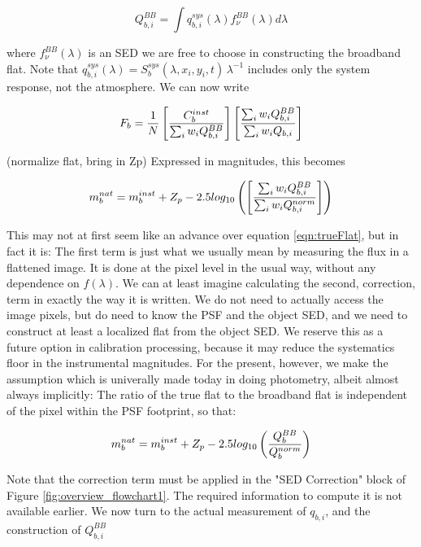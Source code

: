 \documentclass[12pt,preprint]{aastex}
\begin{document}
\begin{equation}
Q_{b,i}^{BB} = \int {q_{b,i}^{sys}(\lambda) f_\nu^{BB}(\lambda) d\lambda}
\end{equation}

where $f_\nu^{BB}(\lambda)$ is an SED we are free to choose in constructing the broadband flat. Note that 
$q_{b,i}^{sys}(\lambda)=S_b^{sys}(\lambda,x_i,y_i,t) \, \lambda^{-1}$ 
includes only the system response, not the atmosphere.  We can now write

\begin{equation}
F_b = {1 \over N} \left[ {C_b^{inst} \over {\sum_i{w_i Q_{b,i}^{BB}}}}\right]  \left[ {\sum_i {w_i Q_{b,i}^{BB} }} \over {\sum_i {w_i Q_{b,i} }}\right]
\end{equation}

(normalize flat, bring in Zp) Expressed in magnitudes, this becomes

\begin{equation}
m_b^{nat} = m_b^{inst} + Z_p - 2.5 log_{10} \left( \left[ {\sum_i {w_i Q_{b,i}^{BB} }} \over {\sum_i {w_i Q_{b,i}^{norm} }}\right] \right)
\end{equation}


This may not at first seem like an advance over equation \ref{eqn:trueFlat}, but in fact it is:  The first term is just what we usually
mean by measuring the flux in a flattened image.  It is done at the pixel level in the usual way, without any dependence on 
$f(\lambda)$.  We can at least imagine calculating the second, correction, term in exactly the way it is written.  We do
not need to actually access the image pixels, but do need to know the PSF and the object SED, and we need to construct at least
a localized flat from the object SED.  We reserve this as a future option in calibration processing, because it may reduce
the systematics floor in the instrumental magnitudes.  For the present, however, we make the assumption which is univerally made
today in doing photometry, albeit almost always implicitly:  The ratio of the true flat to the broadband flat is independent 
of the pixel within the PSF footprint, so that:

\begin{equation}
m_b^{nat} =  m_b^{inst} + Z_p - 2.5 log_{10} \left( {Q_b^{BB}}  \over {Q_b^{norm}} \right) 
\label{eqn:flatCorrection}
\end{equation}

Note that the correction term must be applied in the "SED Correction" block of Figure \ref{fig:overview_flowchart1}.  The 
required information to compute it is not available earlier.  We now turn to the actual measurement of $q_{b,i}$, and the construction of $Q_{b,i}^{BB}$
\end{document}
